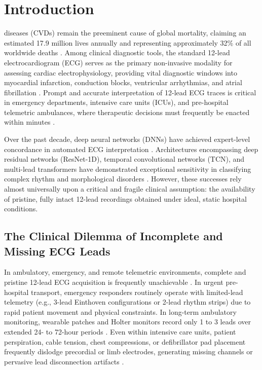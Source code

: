 \documentclass[journal,11pt,draftclsnofoot,onecolumn]{IEEEtran}
\begin{document}
\section{Introduction}
 diseases (CVDs) remain the preeminent cause of global mortality, claiming an estimated 17.9 million lives annually and representing approximately 32\% of all worldwide deaths \cite{ref_1}. Among clinical diagnostic tools, the standard 12-lead electrocardiogram (ECG) serves as the primary non-invasive modality for assessing cardiac electrophysiology, providing vital diagnostic windows into myocardial infarction, conduction blocks, ventricular arrhythmias, and atrial fibrillation \cite{ref_2,ref_3}. Prompt and accurate interpretation of 12-lead ECG traces is critical in emergency departments, intensive care units (ICUs), and pre-hospital telemetric ambulances, where therapeutic decisions must frequently be enacted within minutes \cite{ref_4}.

Over the past decade, deep neural networks (DNNs) have achieved expert-level concordance in automated ECG interpretation \cite{ref_5,ref_6,ref_7}. Architectures encompassing deep residual networks (ResNet-1D), temporal convolutional networks (TCN), and multi-lead transformers have demonstrated exceptional sensitivity in classifying complex rhythm and morphological disorders \cite{ref_8,ref_9,ref_10}. However, these successes rely almost universally upon a critical and fragile clinical assumption: the availability of pristine, fully intact 12-lead recordings obtained under ideal, static hospital conditions.

\subsection{The Clinical Dilemma of Incomplete and Missing ECG Leads}
In ambulatory, emergency, and remote telemetric environments, complete and pristine 12-lead ECG acquisition is frequently unachievable \cite{ref_11}. In urgent pre-hospital transport, emergency responders routinely operate with limited-lead telemetry (e.g., 3-lead Einthoven configurations or 2-lead rhythm strips) due to rapid patient movement and physical constraints. In long-term ambulatory monitoring, wearable patches and Holter monitors record only 1 to 3 leads over extended 24- to 72-hour periods \cite{ref_12}. Even within intensive care units, patient perspiration, cable tension, chest compressions, or defibrillator pad placement frequently dislodge precordial or limb electrodes, generating missing channels or pervasive lead disconnection artifacts \cite{ref_13,ref_14}.
\end{document}
